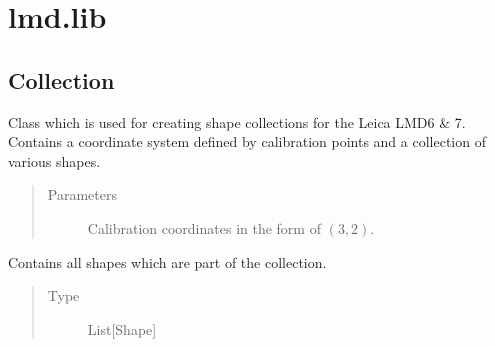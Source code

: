 \documentclass[a4paper,10pt,english,openany,oneside]{sphinxmanual}
\begin{document}
\section{lmd.lib}
\label{\detokenize{pages/modules:lmd-lib}}

\subsection{Collection}
\label{\detokenize{pages/modules:collection}}

\begin{fulllineitems}
\label{\detokenize{pages/modules:lmd.lib.Collection}}
\sphinxAtStartPar
Class which is used for creating shape collections for the Leica LMD6 \& 7. Contains a coordinate system defined by calibration points and a collection of various shapes.
\begin{quote}\begin{description}
\item[{Parameters}] \leavevmode
\sphinxAtStartPar
{} \textendash{} Calibration coordinates in the form of \((3, 2)\).

\end{description}\end{quote}

\begin{fulllineitems}
\label{\detokenize{pages/modules:lmd.lib.Collection.shapes}}
\sphinxAtStartPar
Contains all shapes which are part of the collection.
\begin{quote}\begin{description}
\item[{Type}] \leavevmode
\sphinxAtStartPar
List{[}Shape{]}

\end{description}\end{quote}

\end{fulllineitems}


\end{fulllineitems}
\end{document}
